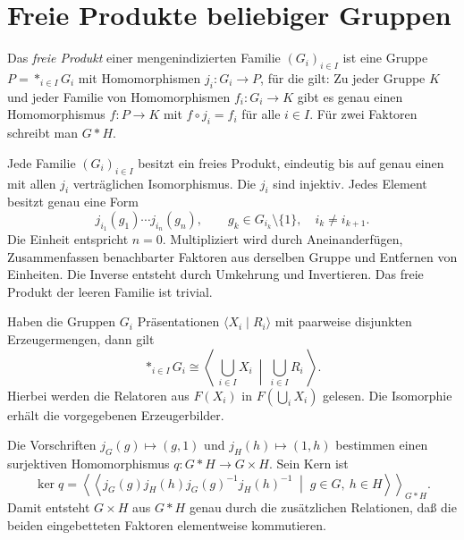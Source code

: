 \section{Freie Produkte beliebiger Gruppen}

\begin{definition}
\label{b40guide:def:free-product}
Das \emph{freie Produkt} einer mengenindizierten Familie
\((G_i)_{i\in I}\) ist eine Gruppe \(P=\mathop{\ast}_{i\in I}G_i\)
mit Homomorphismen \(j_i:G_i\to P\), für die gilt:
Zu jeder Gruppe \(K\) und jeder Familie von Homomorphismen
\(f_i:G_i\to K\) gibt es genau einen Homomorphismus \(f:P\to K\)
mit \(f\circ j_i=f_i\) für alle \(i\in I\).
Für zwei Faktoren schreibt man \(G\ast H\). \cite{mcmullen}
\end{definition}

\begin{theorem}
\label{b40guide:thm:free-product-normal-form}
Jede Familie \((G_i)_{i\in I}\) besitzt ein freies Produkt, eindeutig
bis auf genau einen mit allen \(j_i\) verträglichen Isomorphismus.
Die \(j_i\) sind injektiv. Jedes Element besitzt genau eine Form
\[
 j_{i_1}(g_1)\cdots j_{i_n}(g_n),\qquad
 g_k\in G_{i_k}\setminus\{1\},\quad i_k\ne i_{k+1}.
\]
Die Einheit entspricht \(n=0\). Multipliziert wird durch Aneinanderfügen,
Zusammenfassen benachbarter Faktoren aus derselben Gruppe und Entfernen
von Einheiten. Die Inverse entsteht durch Umkehrung und Invertieren.
Das freie Produkt der leeren Familie ist trivial. \cite{mcmullen}
\end{theorem}

\begin{theorem}
\label{b40guide:thm:free-product-presentation}
Haben die Gruppen \(G_i\) Präsentationen \(\langle X_i\mid R_i\rangle\)
mit paarweise disjunkten Erzeugermengen, dann gilt
\[
 \mathop{\ast}_{i\in I}G_i
 \cong
 \left\langle\ \bigcup_{i\in I}X_i\ \middle|\
                    \bigcup_{i\in I}R_i\ \right\rangle.
\]
Hierbei werden die Relatoren aus \(F(X_i)\) in
\(F(\bigcup_iX_i)\) gelesen. Die Isomorphie erhält die vorgegebenen
Erzeugerbilder. \cite{milne,mcmullen}
\end{theorem}

\begin{theorem}
\label{b40guide:thm:free-to-direct-product}
Die Vorschriften \(j_G(g)\mapsto(g,1)\) und
\(j_H(h)\mapsto(1,h)\) bestimmen einen surjektiven Homomorphismus
\(q:G\ast H\to G\times H\). Sein Kern ist
\[
 \ker q=
 \left\langle\!\left\langle
 j_G(g)j_H(h)j_G(g)^{-1}j_H(h)^{-1}
 \;\middle|\; g\in G,\ h\in H
 \right\rangle\!\right\rangle_{G\ast H}.
\]
Damit entsteht \(G\times H\) aus \(G\ast H\) genau durch die zusätzlichen
Relationen, daß die beiden eingebetteten Faktoren elementweise
kommutieren. \cite{milne,mcmullen}
\end{theorem}
